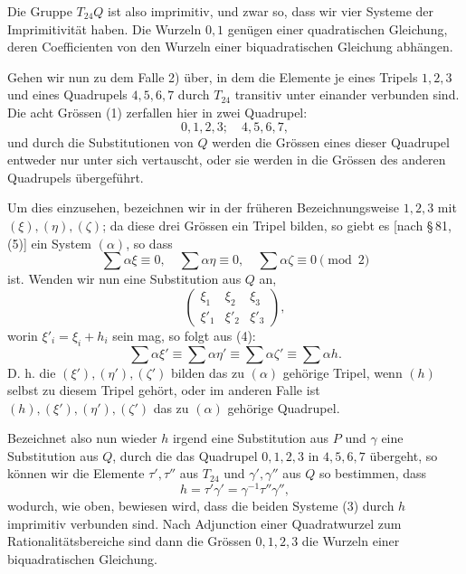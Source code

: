 \documentclass[11pt]{article}
\begin{document}
Die Gruppe $T_{24}Q$ ist also imprimitiv, und zwar so, dass wir vier Systeme der Imprimitivität haben. Die Wurzeln $0,1$ genügen einer quadratischen Gleichung, deren Coefficienten von den Wurzeln einer biquadratischen Gleichung abhängen.

Gehen wir nun zu dem Falle 2) über, in dem die Elemente je eines Tripels $1,2,3$ und eines Quadrupels $4,5,6,7$ durch $T_{24}$ transitiv unter einander verbunden sind. Die acht Grössen (1) zerfallen hier in zwei Quadrupel:
\begin{equation}
 0,1,2,3;\quad 4,5,6,7,
 \tag{3}
\end{equation}
und durch die Substitutionen von $Q$ werden die Grössen eines dieser Quadrupel entweder nur unter sich vertauscht, oder sie werden in die Grössen des anderen Quadrupels übergeführt.

Um dies einzusehen, bezeichnen wir in der früheren Bezeichnungsweise $1,2,3$ mit $(\xi),(\eta),(\zeta)$; da diese drei Grössen ein Tripel bilden, so giebt es [nach \S\,81, (5)] ein System $(\alpha)$, so dass
\begin{equation}
 \sum\alpha\xi\equiv0,
 \quad \sum\alpha\eta\equiv0,
 \quad \sum\alpha\zeta\equiv0\pmod2
 \tag{4}
\end{equation}
ist. Wenden wir nun eine Substitution aus $Q$ an,
\[
 \begin{pmatrix}
  \xi_1&\xi_2&\xi_3\\
  \xi'_1&\xi'_2&\xi'_3
 \end{pmatrix},
\]
worin $\xi'_i=\xi_i+h_i$ sein mag, so folgt aus (4):
\[
 \sum\alpha\xi'\equiv\sum\alpha\eta'\equiv\sum\alpha\zeta'\equiv\sum\alpha h.
\]
D. h. die $(\xi'),(\eta'),(\zeta')$ bilden das zu $(\alpha)$ gehörige Tripel, wenn $(h)$ selbst zu diesem Tripel gehört, oder im anderen Falle ist $(h),(\xi'),(\eta'),(\zeta')$ das zu $(\alpha)$ gehörige Quadrupel.

Bezeichnet also nun wieder $h$ irgend eine Substitution aus $P$ und $\gamma$ eine Substitution aus $Q$, durch die das Quadrupel $0,1,2,3$ in $4,5,6,7$ übergeht, so können wir die Elemente $\tau',\tau''$ aus $T_{24}$ und $\gamma',\gamma''$ aus $Q$ so bestimmen, dass
\[
 h=\tau'\gamma'=\gamma^{-1}\tau''\gamma'',
\]
wodurch, wie oben, bewiesen wird, dass die beiden Systeme (3) durch $h$ imprimitiv verbunden sind. Nach Adjunction einer Quadratwurzel zum Rationalitätsbereiche sind dann die Grössen $0,1,2,3$ die Wurzeln einer biquadratischen Gleichung.
\end{document}
